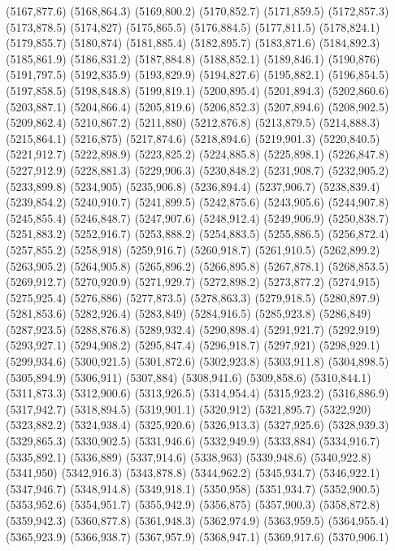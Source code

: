 (5167,877.6)
(5168,864.3)
(5169,800.2)
(5170,852.7)
(5171,859.5)
(5172,857.3)
(5173,878.5)
(5174,827)
(5175,865.5)
(5176,884.5)
(5177,811.5)
(5178,824.1)
(5179,855.7)
(5180,874)
(5181,885.4)
(5182,895.7)
(5183,871.6)
(5184,892.3)
(5185,861.9)
(5186,831.2)
(5187,884.8)
(5188,852.1)
(5189,846.1)
(5190,876)
(5191,797.5)
(5192,835.9)
(5193,829.9)
(5194,827.6)
(5195,882.1)
(5196,854.5)
(5197,858.5)
(5198,848.8)
(5199,819.1)
(5200,895.4)
(5201,894.3)
(5202,860.6)
(5203,887.1)
(5204,866.4)
(5205,819.6)
(5206,852.3)
(5207,894.6)
(5208,902.5)
(5209,862.4)
(5210,867.2)
(5211,880)
(5212,876.8)
(5213,879.5)
(5214,888.3)
(5215,864.1)
(5216,875)
(5217,874.6)
(5218,894.6)
(5219,901.3)
(5220,840.5)
(5221,912.7)
(5222,898.9)
(5223,825.2)
(5224,885.8)
(5225,898.1)
(5226,847.8)
(5227,912.9)
(5228,881.3)
(5229,906.3)
(5230,848.2)
(5231,908.7)
(5232,905.2)
(5233,899.8)
(5234,905)
(5235,906.8)
(5236,894.4)
(5237,906.7)
(5238,839.4)
(5239,854.2)
(5240,910.7)
(5241,899.5)
(5242,875.6)
(5243,905.6)
(5244,907.8)
(5245,855.4)
(5246,848.7)
(5247,907.6)
(5248,912.4)
(5249,906.9)
(5250,838.7)
(5251,883.2)
(5252,916.7)
(5253,888.2)
(5254,883.5)
(5255,886.5)
(5256,872.4)
(5257,855.2)
(5258,918)
(5259,916.7)
(5260,918.7)
(5261,910.5)
(5262,899.2)
(5263,905.2)
(5264,905.8)
(5265,896.2)
(5266,895.8)
(5267,878.1)
(5268,853.5)
(5269,912.7)
(5270,920.9)
(5271,929.7)
(5272,898.2)
(5273,877.2)
(5274,915)
(5275,925.4)
(5276,886)
(5277,873.5)
(5278,863.3)
(5279,918.5)
(5280,897.9)
(5281,853.6)
(5282,926.4)
(5283,849)
(5284,916.5)
(5285,923.8)
(5286,849)
(5287,923.5)
(5288,876.8)
(5289,932.4)
(5290,898.4)
(5291,921.7)
(5292,919)
(5293,927.1)
(5294,908.2)
(5295,847.4)
(5296,918.7)
(5297,921)
(5298,929.1)
(5299,934.6)
(5300,921.5)
(5301,872.6)
(5302,923.8)
(5303,911.8)
(5304,898.5)
(5305,894.9)
(5306,911)
(5307,884)
(5308,941.6)
(5309,858.6)
(5310,844.1)
(5311,873.3)
(5312,900.6)
(5313,926.5)
(5314,954.4)
(5315,923.2)
(5316,886.9)
(5317,942.7)
(5318,894.5)
(5319,901.1)
(5320,912)
(5321,895.7)
(5322,920)
(5323,882.2)
(5324,938.4)
(5325,920.6)
(5326,913.3)
(5327,925.6)
(5328,939.3)
(5329,865.3)
(5330,902.5)
(5331,946.6)
(5332,949.9)
(5333,884)
(5334,916.7)
(5335,892.1)
(5336,889)
(5337,914.6)
(5338,963)
(5339,948.6)
(5340,922.8)
(5341,950)
(5342,916.3)
(5343,878.8)
(5344,962.2)
(5345,934.7)
(5346,922.1)
(5347,946.7)
(5348,914.8)
(5349,918.1)
(5350,958)
(5351,934.7)
(5352,900.5)
(5353,952.6)
(5354,951.7)
(5355,942.9)
(5356,875)
(5357,900.3)
(5358,872.8)
(5359,942.3)
(5360,877.8)
(5361,948.3)
(5362,974.9)
(5363,959.5)
(5364,955.4)
(5365,923.9)
(5366,938.7)
(5367,957.9)
(5368,947.1)
(5369,917.6)
(5370,906.1)
